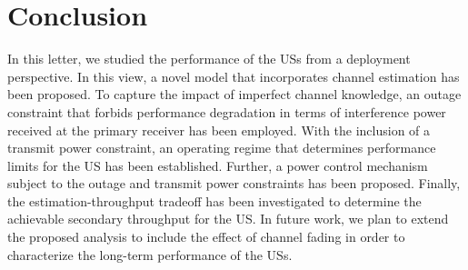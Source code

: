\documentclass[12pt, draftclsnofoot, onecolumn]{IEEEtran}
\begin{document}
\vspace{-2mm}
\section{Conclusion} \label{sec:conc}
In this letter, we studied the performance of the USs from a deployment perspective. In this view, a novel model that incorporates channel estimation has been proposed. To capture the impact of imperfect channel knowledge, an outage constraint that forbids performance degradation in terms of interference power received at the primary receiver has been employed. With the inclusion of a transmit power constraint, an operating regime that determines performance limits for the US has been established. Further, a power control mechanism subject to the outage and transmit power constraints has been proposed. Finally, the estimation-throughput tradeoff has been investigated to determine the achievable secondary throughput for the US. In future work, we plan to extend the proposed analysis to include the effect of channel fading in order to characterize the long-term performance of the USs. 


\vspace{-4mm}



\end{document}
